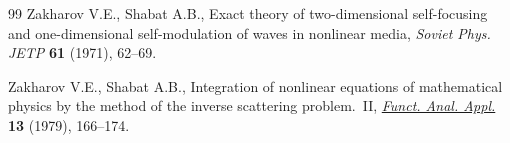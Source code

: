 \documentclass[pdftex]{sigma}
\numberwithin{equation}{section}
\begin{document}
\begin{thebibliography}{99}
Zakharov V.E., Shabat A.B., Exact theory of two-dimensional self-focusing and
 one-dimensional self-modulation of waves in nonlinear media, \textit{Soviet
 Phys. JETP} \textbf{61} (1971), 62--69.

Zakharov V.E., Shabat A.B., Integration of nonlinear equations of mathematical
 physics by the method of the inverse scattering problem.~{II}, \href{http://dx.doi.org/10.1007/BF01077483}{\textit{Funct.
 Anal. Appl.}} \textbf{13} (1979), 166--174.

\end{thebibliography}\LastPageEnding
\end{document}
